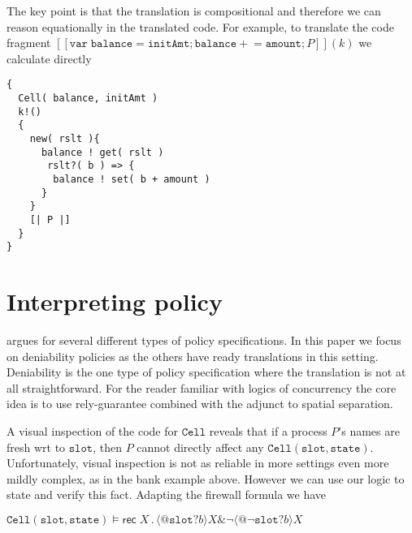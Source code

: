 \documentclass[]{amsart}
\makeatletter
\newcommand{\ldb}{[\![}
\newcommand{\rdb}{]\!]}
\newcommand{\quotep}[1]{@#1}
\newcommand{\meaningof}[1]{\ldb #1 \rdb}
\newcommand{\pprefix}[3]{\langle #1 ? #2 \rangle #3}
\newcommand{\pgfp}[2]{\textsf{rec} \; #1 \mathbin{.} #2}
\theoremstyle{definition}
\theoremstyle{remark}
\numberwithin{equation}{subsection}
\makeatother
\begin{document}


The key point is that the translation is compositional and therefore
we can reason equationally in the translated code. For example, to
translate the code fragment $\meaningof{ \texttt{var}\;
  \texttt{balance} = \texttt{initAmt}; \texttt{balance} +\!=
  \texttt{amount}; P }( k )$ we calculate directly


\begin{lstlisting}
{ 
  Cell( balance, initAmt ) 
  k!() 
  {
    new( rslt ){
      balance ! get( rslt )  
       rslt?( b ) => {
        balance ! set( b + amount )
      }
    } 
    [| P |] 
  }
}
\end{lstlisting}


\section{Interpreting policy}

\cite{Drossopoulou} argues for several different types of policy
specifications. In this paper we focus on deniability policies as the
others have ready translations in this setting. Deniability is the one
type of policy specification where the translation is not at all
straightforward. For the reader familiar with logics of concurrency the
core idea is to use rely-guarantee combined with the adjunct to
spatial separation.

A visual inspection of the code for $\texttt{Cell}$ reveals that if a
process $P$’s names are fresh wrt to $\texttt{slot}$, then $P$ cannot
directly affect any $\texttt{Cell}( \texttt{slot}, \texttt{state}
)$. Unfortunately, visual inspection is not as reliable in more
settings even more mildly complex, as in the bank example
above. However we can use our logic to state and verify this
fact. Adapting the firewall formula we have

$\texttt{Cell}(\texttt{slot},\texttt{state}) \models \pgfp{X}{\pprefix{\quotep{\texttt{slot}}}{b}{X} \& \neg \pprefix{\quotep{\neg \texttt{slot}}}{b}{X}}$
\end{document}

